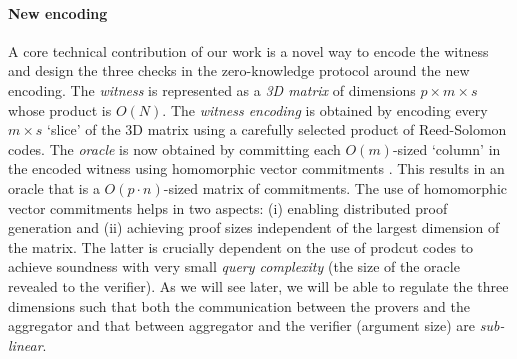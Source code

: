 \paragraph{New encoding} A core technical contribution of our
work is a novel way to encode the witness and design the three checks in
the zero-knowledge protocol around the new encoding. The \textit{witness} is
represented as a \textit{3D matrix} of dimensions $p \times m \times s$ whose
product is $O(N)$. The \textit{witness encoding} is obtained by encoding every
$m \times s$ `slice' of the 3D matrix using a carefully selected product of
Reed-Solomon codes. %
The \textit{oracle} is now obtained by committing each $O(m)$-sized `column' in 
the encoded witness using homomorphic vector commitments \cite{Ped92}. 
This results in an oracle that is a $O(p \cdot n)$-sized matrix of commitments.
The use of homomorphic vector commitments helps in two aspects: (i) enabling
distributed proof generation and (ii) achieving proof sizes independent of the
largest dimension of the matrix. The latter is crucially dependent on the use
of prodcut codes to achieve soundness with very small {\em query complexity} (the size of the
oracle revealed to the verifier).
As we will see later, we will be able to regulate the three dimensions such that
both the communication between the provers and the
aggregator and that between aggregator and the verifier (argument size) are 
{\em sub-linear}. 
